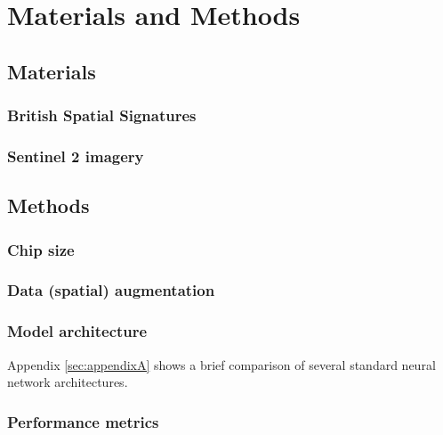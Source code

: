 \section{Materials and Methods}
\label{sec:matmet}

\subsection{Materials}

\subsubsection{British Spatial Signatures}

\subsubsection{Sentinel 2 imagery}

\subsection{Methods}

\subsubsection{Chip size}
\subsubsection{Data (spatial) augmentation}


\subsubsection{Model architecture}


Appendix \ref*{sec:appendixA} shows a brief comparison of several standard neural network architectures.





\subsubsection{Performance metrics}


